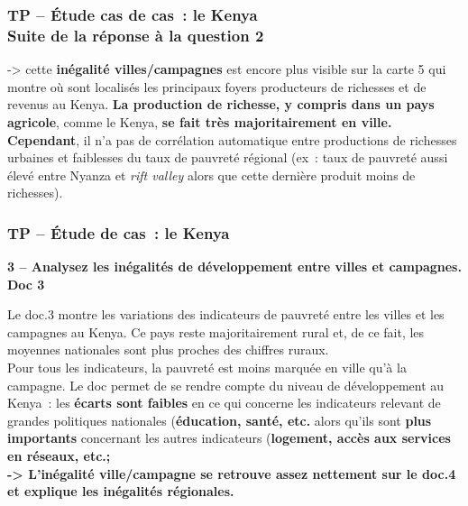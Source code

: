 \documentclass[C]{beamer}
\begin{document}
	\begin{frame}
	\frametitle{TP -- \'Etude cas de cas~: le Kenya\\ Suite de la réponse à la question 2}
-> cette \textbf{inégalité villes/campagnes} est encore plus visible sur la carte 5 qui montre où sont localisés les principaux foyers producteurs de richesses et de revenus au Kenya. \textbf{La production de richesse, y compris dans un pays agricole}, comme le Kenya, \textbf{se fait très majoritairement en ville.}
\\
\textbf{Cependant}, il n'a pas de corrélation automatique entre productions de richesses urbaines et faiblesses du taux de pauvreté régional (ex~: taux de pauvreté aussi élevé entre Nyanza et \textit{rift valley} alors que cette dernière produit moins de richesses).
	\end{frame}
	
	\begin{frame}
	\frametitle{TP -- \'Etude de cas~: le Kenya}
	\begin{center}
	\textbf{3 -- Analysez les inégalités de développement entre villes et campagnes. Doc 3}
	\end{center}
Le doc.3 montre les variations des indicateurs de pauvreté entre les villes et les campagnes au Kenya. Ce pays reste majoritairement rural et, de ce fait, les moyennes nationales sont plus proches des chiffres ruraux.\\
\pause
Pour tous les indicateurs, la pauvreté est moins marquée en ville qu'à la campagne. Le doc permet de se rendre compte du niveau de développement au Kenya~: les \textbf{écarts sont faibles} en ce qui concerne les indicateurs relevant de grandes politiques nationales (\textbf{éducation, santé, etc.} alors qu'ils sont \textbf{plus importants} concernant les autres indicateurs (\textbf{logement, accès aux services en réseaux, etc.;}\\
\pause
\textbf{-> L'inégalité ville/campagne se retrouve assez nettement sur le doc.4 et explique les inégalités régionales.}
	\end{frame}
	
\end{document}
